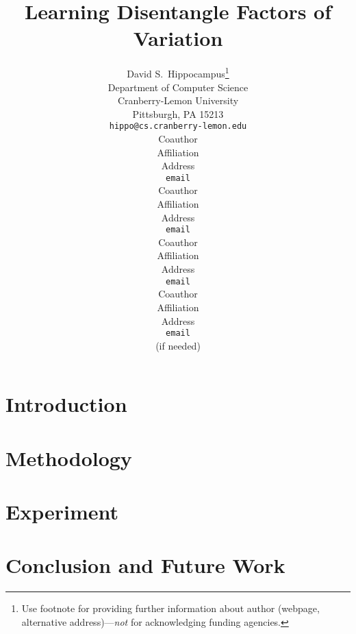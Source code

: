 \documentclass{article} %
\title{Learning Disentangle Factors of Variation}
\author{
David S.~Hippocampus\thanks{ Use footnote for providing further information
about author (webpage, alternative address)---\emph{not} for acknowledging
funding agencies.} \\
Department of Computer Science\\
Cranberry-Lemon University\\
Pittsburgh, PA 15213 \\
\texttt{hippo@cs.cranberry-lemon.edu} \\
\And
Coauthor \\
Affiliation \\
Address \\
\texttt{email} \\
\AND
Coauthor \\
Affiliation \\
Address \\
\texttt{email} \\
\And
Coauthor \\
Affiliation \\
Address \\
\texttt{email} \\
\And
Coauthor \\
Affiliation \\
Address \\
\texttt{email} \\
(if needed)\\
}
\begin{document}
\maketitle
\begin{abstract}

\end{abstract}
\section{Introduction}


\section{Methodology}


\section{Experiment}


\section{Conclusion and Future Work}



\clearpage


\end{document}
